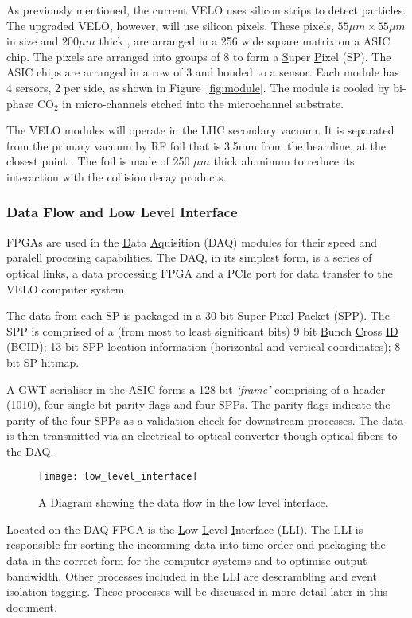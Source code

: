       As previously mentioned, the current VELO uses silicon strips to detect particles.
      The upgraded VELO, however, will use silicon pixels.
      These pixels, $55 \mu m \times 55 \mu m$ in size and $200 \mu m$ thick \cite{velo_design_report}, are arranged in a 256 wide square matrix on a ASIC chip.
      The pixels are arranged into groups of 8 to form a \underline{S}uper \underline{P}ixel (SP).
      The ASIC chips are arranged in a row of 3 and bonded to a sensor.
      Each module has 4 sersors, 2 per side, as shown in Figure~\ref{fig:module}. 
      The module is cooled by bi-phase CO$_2$ in micro-channels etched into the microchannel substrate. \cite{velo_design_report}
      \par
      The VELO modules will operate in the LHC secondary vacuum.
      It is separated from the primary vacuum by RF foil that is 3.5mm from the beamline, at the closest point \cite{velo_design_report}.
      The foil is made of 250 $\mu m$ thick aluminum to reduce its interaction with the collision decay products. 

      \subsubsection{Data Flow and Low Level Interface}   

      FPGAs are used in the \underline{D}ata \underline{Aq}uisition (DAQ) modules for their speed and paralell procesing capabilities.
      The DAQ, in its simplest form, is a series of optical links, a data processing FPGA and a PCIe port for data transfer to the VELO computer system.
      \par
      The data from each SP is packaged in a 30 bit \underline{S}uper \underline{P}ixel \underline{P}acket (SPP). The SPP is comprised of  a (from most to least significant bits) 9 bit \underline{B}unch \underline{C}ross \underline{ID} (BCID); 13 bit SPP location information (horizontal and vertical coordinates); 8 bit SP hitmap.
      \par
      A GWT serialiser in the ASIC forms a 128 bit \textit{`frame'} comprising of a header (1010), four single bit parity flags and four SPPs.
      The parity flags indicate the parity of the four SPPs as a validation check for downstream processes.
      The data is then transmitted via an electrical to optical converter though optical fibers to the DAQ.
      \begin{figure}[ht]
        \centering
        \texttt{[image: low\_level\_interface]}
        \caption{A Diagram showing the data flow in the low level interface.}
        \label{fig:lli}
      \end{figure}
      Located on the DAQ FPGA is the \underline{L}ow \underline{L}evel \underline{I}nterface (LLI).
      The LLI is responsible for sorting the incomming data into time order and packaging the data in the correct form for the computer systems and to optimise output bandwidth.
      Other processes included in the LLI are descrambling and event isolation tagging.
      These processes will be discussed in more detail later in this document.
